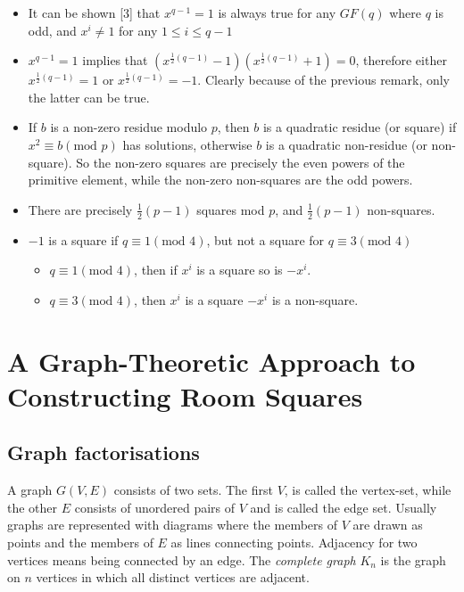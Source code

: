 \documentclass[
  11pt,
  a4paper]{book}
\begin{document}
\begin{itemize}
\item
  It can be shown {[}3{]} that \(x^{q-1}=1\) is always true for any \(GF(q)\)
  where \(q\) is odd, and \(x^i \neq 1\) for any \(1 \leq i \leq q-1\)
\item
  \(x^{q-1}=1\) implies that
  \((x^{\frac{1}{2}(q-1)}-1)(x^{\frac{1}{2}(q-1)}+1)=0\), therefore
  either \(x^{\frac{1}{2}(q-1)}=1\) or \(x^{\frac{1}{2}(q-1)}=-1\).
  Clearly because of the previous remark, only the latter can be true.
\item
  If \(b\) is a non-zero residue modulo \(p\), then \(b\) is a quadratic
  residue (or square) if \(x^2 \equiv b(\textrm{mod } p)\) has
  solutions, otherwise \(b\) is a quadratic non-residue (or non-square).
  So the non-zero squares are precisely the even powers of the
  primitive element, while the non-zero non-squares are the odd
  powers.
\item
  There are precisely \(\frac{1}{2}(p-1)\) squares mod \(p\), and
  \(\frac{1}{2}(p-1)\) non-squares.
\item
  \(-1\) is a square if \(q \equiv 1(\textrm{mod } 4)\), but not a square
  for \(q \equiv 3(\textrm{mod } 4)\)

  \begin{itemize}
  \item
    \(q \equiv 1(\textrm{mod } 4)\), then if \(x^i\) is a square so is
    \(-x^i\).
  \item
    \(q \equiv 3(\textrm{mod } 4)\), then \(x^i\) is a square \(-x^i\) is
    a non-square.
  \end{itemize}
\end{itemize}

\hypertarget{a-graph-theoretic-approach-to-constructing-room-squares}{%
\chapter{A Graph-Theoretic Approach to Constructing Room Squares}\label{a-graph-theoretic-approach-to-constructing-room-squares}}

\hypertarget{graph-factorisations}{%
\section{Graph factorisations}\label{graph-factorisations}}

A graph \(G(V,E)\) consists of two sets. The first \(V\),
is called the vertex-set, while the other \(E\) consists
of unordered pairs of \(V\) and is called the edge set.
Usually graphs are represented with diagrams where the
members of \(V\) are drawn as points and the members of
\(E\) as lines connecting points. Adjacency for two vertices
means being connected by an edge. The \emph{complete graph}
\(K_n\) is the graph on \(n\) vertices in which all distinct
vertices are adjacent.
\end{document}
